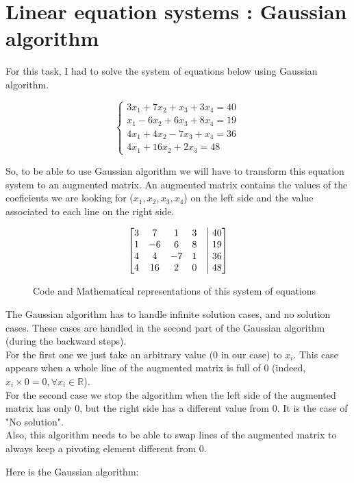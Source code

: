 \section{Linear equation systems : Gaussian algorithm}
For this task, I had to solve the system of equations below using Gaussian algorithm.

\begin{equation}
    \begin{cases}
3x_1 + 7x_2 + x_3 + 3 x_4 = 40\\
x_1 - 6x_2 + 6x_3 + 8 x_4 = 19\\
4x_1 + 4x_2 - 7 x_3 + x_4 = 36\\
4x_1 + 16x_2 + 2x_3 = 48
\end{cases}\,
\end{equation}

So, to be able to use Gaussian algorithm we will have to transform this equation system to an augmented matrix. An augmented matrix contains the values of the coeficients we are looking for ($x_1, x_2, x_3, x_4$) on the left side and the value associated to each line on the right side.\\

\begin{figure}[htbp]
    \begin{minipage}{0.5\textwidth}
      \centering
      
    \end{minipage}%
    \begin{minipage}{0.5\textwidth}
      \centering
      $$\begin{bmatrix}
        3 & 7  & 1 & 3 &\bigm| 40 \\
        1 & -6 & 6 & 8 &\bigm| 19 \\
        4 & 4 & -7 & 1 &\bigm| 36 \\
        4 & 16 & 2 & 0 &\bigm| 48 \\
      \end{bmatrix}$$
    \end{minipage}
    \caption{Code and Mathematical representations of this system of equations}
\end{figure}

The Gaussian algorithm has to handle infinite solution cases, and no solution cases. These cases are handled in the second part of the Gaussian algorithm (during the backward steps).\\
For the first one we just take an arbitrary value (0 in our case) to $x_i$. This case appears when a whole line of the augmented matrix is full of 0 (indeed, $x_i \times 0 = 0, \forall x_i \in \mathbb{R}$).\\
For the second case we stop the algorithm when the left side of the augmented matrix has only 0, but the right side has a different value from 0. It is the case of "No solution".\\
Also, this algorithm needs to be able to swap lines of the augmented matrix to always keep a pivoting element different from 0.

Here is the Gaussian algorithm:


